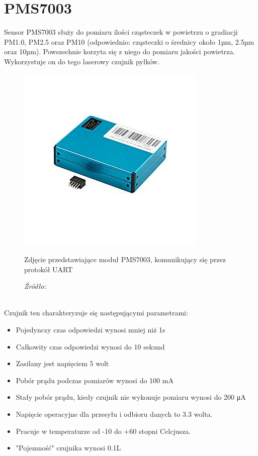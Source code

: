 \documentclass[12pt,a4paper,oneside]{memoir}
\begin{document}
\section{PMS7003}
Sensor PMS7003 służy do pomiaru ilości cząsteczek w powietrzu o gradiacji PM1.0, PM2.5 oraz PM10 (odpowiednio: cząsteczki o średnicy około 1µm, 2.5µm oraz 10µm). Powszechnie korzyta się z niego do pomiaru jakości powietrza. Wykorzystuje on do tego laserowy czujnik pyłków.
\begin{figure}[h]
	\centering
	\includegraphics[scale=0.5]{images/pms7003.jpg}
	{\tytulyrozdzialow \footnotesize \caption[PMS7003] {Zdjęcie przedstawiające moduł PMS7003, komunikujący się przez protokół UART}}
	\caption*{\textit{Źródło: \cite{pms7003module}}}
\end{figure}\\
Czujnik ten charakteryzuje się następującymi parametrami:
\begin{itemize}
	\item Pojedynczy czas odpowiedzi wynosi mniej niż 1s
	\item Całkowity czas odpowiedzi wynosi do 10 sekund
	\item Zasilany jest napięciem 5 wolt
	\item Pobór prądu podczas pomiarów wynosi do 100 mA
	\item Stały pobór prądu, kiedy czujnik nie wykonuje pomiaru wynosi do 200 μA
	\item Napięcie operacyjne dla przesyłu i odbioru danych to 3.3 wolta.
	\item Pracuje w temperaturze od -10 do +60 stopni Celcjusza.
	\item "Pojemność" czujnika wynosi 0.1L
\end{itemize}
\end{document}

